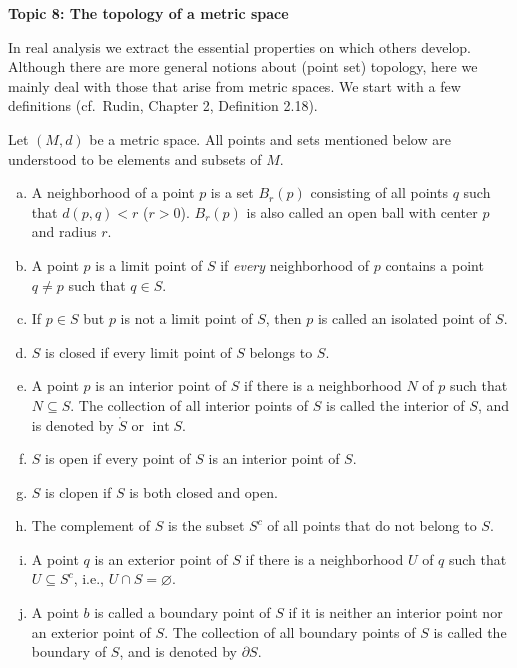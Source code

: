 \documentclass[11pt]{article}
\begin{document}
\begin{center}
  \textbf{Topic 8: The topology of a metric space}
\end{center}

In real analysis we extract the essential properties on which others develop.
Although there are more general notions about (point set) topology, here we mainly deal with those that arise from metric spaces.
We start with a few definitions (cf.\ Rudin, Chapter 2, Definition 2.18).

\begin{defn}
  Let $(M, d)$ be a metric space.
  All points and sets mentioned below are understood to be elements and subsets of $M$.
  \begin{enumerate}[(a)]
    \item A \textsf{neighborhood} of a point $p$ is a set $B_r(p)$ consisting of all points $q$ such that $d(p,q) < r$ ($r > 0$).
      $B_r(p)$ is also called an \textsf{open ball} with center $p$ and radius $r$.

    \item A point $p$ is a \textsf{limit point} of $S$ if \textit{every} neighborhood of $p$ contains a point $q \ne p$ such that $q \in S$.

    \item If $p \in S$ but $p$ is not a limit point of $S$, then $p$ is called an \textsf{isolated point} of $S$.

    \item $S$ is \textsf{closed} if every limit point of $S$ belongs to $S$.

    \item A point $p$ is an \textsf{interior point} of $S$ if there is a neighborhood $N$ of $p$ such that $N \subseteq S$.  The collection of all interior points of $S$ is called the \textsf{interior} of $S$, and is denoted by $\mathring{S}$ or $\operatorname{int} S$.

    \item $S$ is \textsf{open} if every point of $S$ is an interior point of $S$.

    \item $S$ is \textsf{clopen} if $S$ is both closed and open.

    \item The \textsf{complement} of $S$ is the subset $S^c$ of all points that do not belong to $S$.

    \item A point $q$ is an \textsf{exterior point} of $S$ if there is a neighborhood $U$ of $q$ such that $U \subseteq S^c$, i.e., $U \cap S = \varnothing$.

    \item A point $b$ is called a \textsf{boundary point} of $S$ if it is neither an interior point nor an exterior point of $S$.
      The collection of all boundary points of $S$ is called the \textsf{boundary} of $S$, and is denoted by $\partial S$.
  \end{enumerate}
\end{defn}
\end{document}
